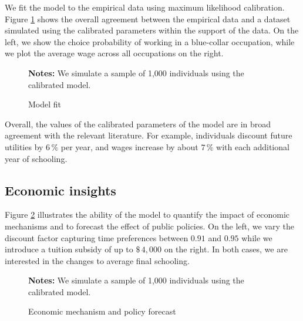 \noindent We fit the model to the empirical data using maximum likelihood calibration. Figure \ref{Model fit} shows the overall agreement between the empirical data and a dataset simulated using the calibrated parameters within the support of the data. On the left, we show the choice probability of working in a blue-collar occupation, while we plot the average wage across all occupations on the right.
%
\begin{figure}[h!]\centering
\caption{Model fit}\label{Model fit}
\hspace{0.3cm}
\begin{center}
\begin{minipage}[t]{0.7\columnwidth}
\item \scriptsize{\textbf{Notes:} We simulate a sample of 1,000 individuals using the calibrated model.}
\end{minipage}\end{center}
\end{figure}\FloatBarrier
%
\noindent Overall, the values of the calibrated parameters of the model are in broad agreement with the relevant literature. For example, individuals discount future utilities by $6\,\%$ per year, and wages increase by about $7\,\%$ with each additional year of schooling.
\subsection{Economic insights}
Figure \ref{Economic mechanism and policy forecast} illustrates the ability of the model to quantify the impact of economic mechanisms and to forecast the effect of public policies. On the left, we vary the discount factor capturing time preferences between $0.91$ and $0.95$ while we introduce a tuition subsidy of up to $\$\,4,000$ on the right. In both cases, we are interested in the changes to average final schooling.

\begin{figure}[h!]\centering
\caption{Economic mechanism and policy forecast}\label{Economic mechanism and policy forecast}
\hspace{0.3cm}
\begin{center}
\begin{minipage}[t]{0.60\columnwidth}
\item \scriptsize{\textbf{Notes:} We simulate a sample of 1,000 individuals using the calibrated model.}
\end{minipage}
\end{center}
\end{figure}\FloatBarrier

